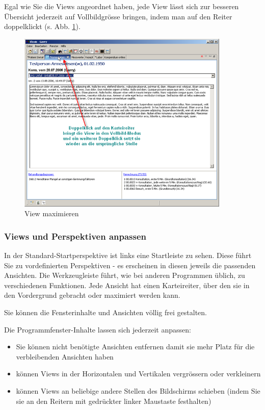 Egal wie Sie die Views angeordnet haben, jede View lässt sich zur besseren
Übersicht jederzeit auf Vollbildgrösse bringen, indem man auf den Reiter
doppelklickt (s. Abb. \ref{fig:tour3}).

\begin{figure}[htp]
\begin{center}
  \includegraphics[width=0.9\textwidth]{images/tour3}
  \caption{View maximieren}
  \label{fig:tour3}
\end{center}
\end{figure}

\subsubsection{Views und Perspektiven anpassen}


In der Standard-Startperspektive ist links eine \glqq Startleiste\grqq{} zu
sehen. Diese führt Sie zu vordefinierten Perspektiven - es erscheinen in diesen
jeweils die passenden Ansichten. Die Werkzeugleiste führt, wie bei anderen
Programmen üblich, zu verschiedenen Funktionen. Jede Ansicht hat einen
Karteireiter, über den sie in den Vordergrund gebracht oder maximiert werden kann.

Sie können die Fensterinhalte und Ansichten völlig frei gestalten.


Die Programmfenster-Inhalte lassen sich jederzeit anpassen:
\begin{itemize}
  \item Sie können nicht benötigte Ansichten entfernen damit sie mehr Platz für
  die verbleibenden Ansichten haben
	\item können Views in der Horizontalen und Vertikalen vergrössern oder verkleinern
	\item können Views an beliebige andere Stellen des Bildschirms schieben (indem Sie sie
	an den Reitern mit gedrückter linker Maustaste \glqq festhalten\grqq{})
\end{itemize}

